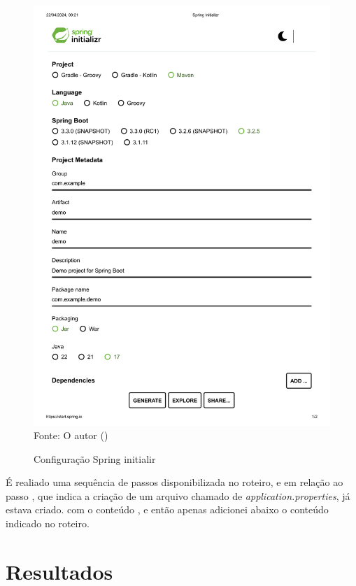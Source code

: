 \begin{figure}[H]
\center
  \caption{Configuração Spring initialir}
  \includegraphics[scale=0.6]{figure/Spring Initializr.pdf}
  \label{fig:spring}
  \flushleft %
    {\fontsize{10pt}{\baselineskip}\selectfont
    Fonte: O autor (\the\year) }
\end{figure}


\par É realiado uma sequência de passos disponibilizada no roteiro, e em relação ao passo , que indica a criação de um arquivo chamado de \textit{application.properties}, já estava criado. com o conteúdo , e então apenas adicionei abaixo o conteúdo indicado no roteiro.



\section{Resultados}





